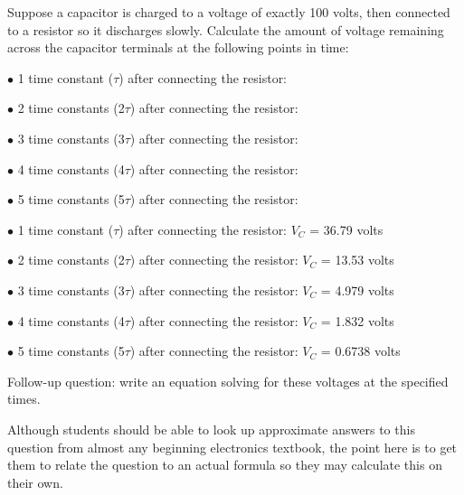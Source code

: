 

Suppose a capacitor is charged to a voltage of exactly 100 volts, then connected to a resistor so it discharges slowly.  Calculate the amount of voltage remaining across the capacitor terminals at the following points in time:

\medskip
\item{$\bullet$} 1 time constant ($\tau$) after connecting the resistor:
\item{$\bullet$} 2 time constants (2$\tau$) after connecting the resistor:
\item{$\bullet$} 3 time constants (3$\tau$) after connecting the resistor:
\item{$\bullet$} 4 time constants (4$\tau$) after connecting the resistor:
\item{$\bullet$} 5 time constants (5$\tau$) after connecting the resistor:
\medskip







\medskip
\item{$\bullet$} 1 time constant ($\tau$) after connecting the resistor: $V_C$ = 36.79 volts
\item{$\bullet$} 2 time constants (2$\tau$) after connecting the resistor: $V_C$ = 13.53 volts
\item{$\bullet$} 3 time constants (3$\tau$) after connecting the resistor: $V_C$ = 4.979 volts
\item{$\bullet$} 4 time constants (4$\tau$) after connecting the resistor: $V_C$ = 1.832 volts
\item{$\bullet$} 5 time constants (5$\tau$) after connecting the resistor: $V_C$ = 0.6738 volts
\medskip

\vskip 10pt

Follow-up question: write an equation solving for these voltages at the specified times.







Although students should be able to look up approximate answers to this question from almost any beginning electronics textbook, the point here is to get them to relate the question to an actual formula so they may calculate this on their own.




